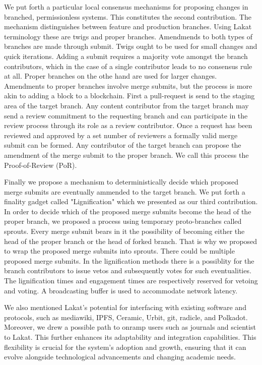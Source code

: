 We put forth a particular local consensus mechanisms for proposing changes in branched, permissionless systems. This constitutes the second contribution. The mechanism distinguishes between feature and production branches. Using Lakat terminology these are twigs and proper branches. Amendmends to both types of branches are made through submit. Twigs ought to be used for small changes and quick iterations. Adding a submit requires a majority vote amongst the branch contributors, which in the case of a single contributor leads to no consensus rule at all. Proper branches on the othe hand are used for larger changes. Amendments to proper branches involve merge submits, but the process is more akin to adding a block to a blockchain. First a pull-request is send to the staging area of the target branch. Any content contributor from the target branch may send a review commitment to the requesting branch and can participate in the review process through its role as a review contributor. Once a request has been reviewed and approved by a set number of reviewers a formally valid merge submit can be formed. Any contributor of the target branch can propose the amendment of the merge submit to the proper branch. We call this process the Proof-of-Review (PoR).

Finally we propose a mechanism to deterministically decide which proposed merge submits are eventually ammended to the target branch. We put forth a finality gadget called "Lignification" which we presented as our third contribution. In order to decide which of the proposed merge submits become the head of the proper branch, we proposed a process using temporary proto-branches called sprouts. Every merge submit bears in it the possibility of becoming either the head of the proper branch or the head of forked branch. That is why we proposed to wrap the proposed merge submits into sprouts. There could be multiple proposed merge submits. In the lignification methods there is a possiblity for the branch contributors to issue vetos and subsequently votes for such eventualities. The lignification times and engagement times are respectively reserved for vetoing and voting. A broadcasting buffer is used to accommodate network latency. 

We also mentioned Lakat's potential for interfacing with existing software and protocols, such as mediawiki, IPFS, Ceramic, Urbit, git, radicle, and Polkadot. Moreover, we drew a possible path to onramp users such as journals and scientist to Lakat. This further enhances its adaptability and integration capabilities. This flexibility is crucial for the system's adoption and growth, ensuring that it can evolve alongside technological advancements and changing academic needs.

